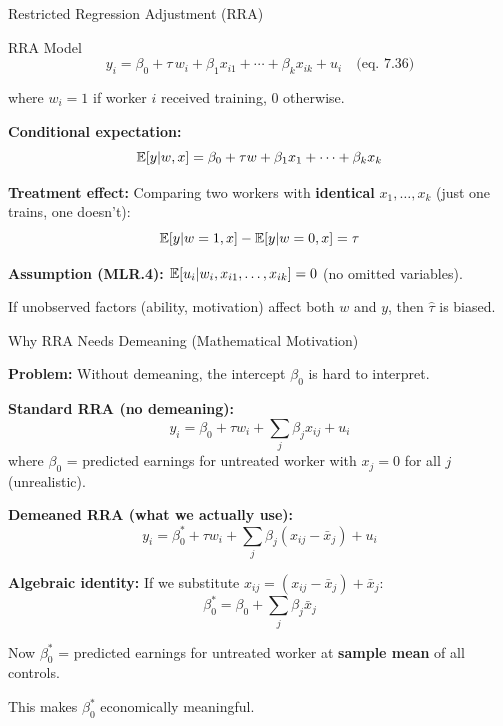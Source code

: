 \documentclass[aspectratio=169, 12pt]{beamer}
\begin{document}
\begin{frame}[shrink=22]{Restricted Regression Adjustment (RRA)}

  \begin{definitionbox}{RRA Model}
    \[
      y_i = \beta_0 + \tau \, w_i + \beta_1 x_{i1} + \cdots + \beta_k x_{ik} + u_i \quad \text{(eq.\ 7.36)}
    \]

    where $w_i = 1$ if worker $i$ received training, 0 otherwise.
  \end{definitionbox}

  \medskip

  \textbf{Conditional expectation:}
  \[
    \operatorname{\mathbb{E}}[y | w, x] = \beta_0 + \tau w + \beta_1 x_1 + \cdots + \beta_k x_k
  \]

  \medskip

  \textbf{Treatment effect:} Comparing two workers with \textbf{identical} $x_1, \ldots, x_k$ (just one trains, one doesn't):
  \[
    \operatorname{\mathbb{E}}[y | w=1, x] - \operatorname{\mathbb{E}}[y | w=0, x] = \tau
  \]

  \medskip

  \begin{keybox}
    \textbf{Assumption (MLR.4):} $\operatorname{\mathbb{E}}[u_i | w_i, x_{i1}, \ldots, x_{ik}] = 0$ (no omitted variables).

    If unobserved factors (ability, motivation) affect both $w$ and $y$, then $\hat{\tau}$ is biased.
  \end{keybox}

\end{frame}

\begin{frame}[shrink=25]{Why RRA Needs Demeaning (Mathematical Motivation)}

  \textbf{Problem:} Without demeaning, the intercept $\beta_0$ is hard to interpret.

  \medskip

  \textbf{Standard RRA (no demeaning):}
  \[
    y_i = \beta_0 + \tau w_i + \sum_j \beta_j x_{ij} + u_i
  \]
  where $\beta_0$ = predicted earnings for untreated worker with $x_j = 0$ for all $j$ (unrealistic).

  \medskip

  \textbf{Demeaned RRA (what we actually use):}
  \[
    y_i = \beta_0^* + \tau w_i + \sum_j \beta_j (x_{ij} - \bar{x}_j) + u_i
  \]

  \medskip

  \textbf{Algebraic identity:} If we substitute $x_{ij} = (x_{ij} - \bar{x}_j) + \bar{x}_j$:
  \[
    \beta_0^* = \beta_0 + \sum_j \beta_j \bar{x}_j
  \]

  \medskip

  \begin{highlightbox}
    Now $\beta_0^*$ = predicted earnings for untreated worker at \textbf{sample mean} of all controls.

    This makes $\beta_0^*$ economically meaningful.
  \end{highlightbox}

\end{frame}
\end{document}
